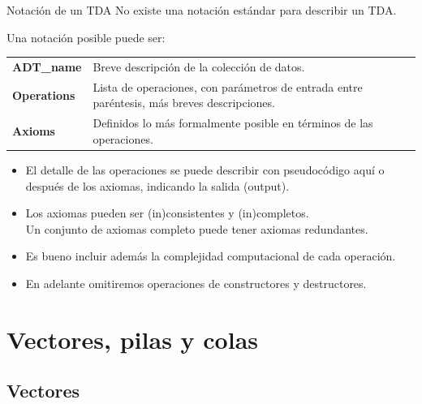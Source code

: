 \documentclass{beamer} %
\begin{document}
\begin{frame}{Notación de un TDA}
    No existe una notación estándar para describir un TDA.
    
    Una notación posible puede ser:
    \medskip
    
    \begin{tabular}{lp{45ex}}\hline
      {\bf ADT\_name}   & {\small Breve descripción de la colección de datos.}\\
      {\bf Operations} & {\small Lista de operaciones, con parámetros de entrada entre paréntesis, más breves descripciones.}\\
      {\bf Axioms}     & {\small Definidos lo más formalmente posible en términos de las operaciones.}\\\hline
    \end{tabular}
    \medskip
    
    \footnotesize{
    \begin{itemize}
        \item<2-> El detalle de las operaciones se puede describir con pseudocódigo aquí o después de los axiomas, indicando la salida (output).
        \item<3-> Los axiomas pueden ser (in)consistentes y (in)completos.\\
        Un conjunto de axiomas completo puede tener axiomas redundantes.
        \item<4-> Es bueno incluir además la complejidad computacional de cada operación.
        \item<5-> En adelante omitiremos operaciones de constructores y destructores.
    \end{itemize}}
\end{frame}

\section{Vectores, pilas y colas}

\subsection{Vectores}
\end{document}
